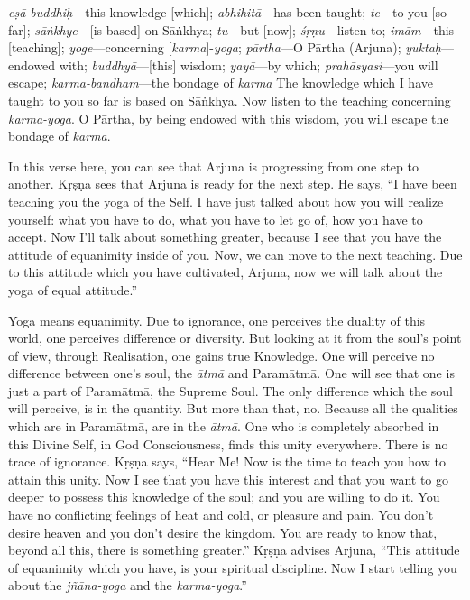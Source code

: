 {%
  \textit{eṣā buddhiḥ}---this knowledge [which]; 
  \textit{abhihitā}---has been taught; 
  \textit{te}---to you [so far]; 
  \textit{sāṅkhye}---[is based] on Sāṅkhya; 
  \textit{tu}---but [now]; 
  \textit{śṛṇu}---listen to; 
  \textit{imām}---this [teaching]; 
  \textit{yoge}---concerning [\textit{karma}]-\textit{yoga}; 
  \textit{pārtha}---O Pārtha (Arjuna); 
  \textit{yuktaḥ}---endowed with; 
  \textit{buddhyā}---[this] wisdom; 
  \textit{yayā}---by which; 
  \textit{prahāsyasi}---you will escape; 
  \textit{karma-bandham}---the bondage of \textit{karma}
}
{%
  The knowledge which I have taught to you so far is based on Sāṅkhya. Now listen to the teaching concerning \textit{karma-yoga}. O Pārtha, by being endowed with this wisdom, you will escape the bondage of \textit{karma}.
}

In this verse here, you can see that Arjuna is progressing from one step to another. Kṛṣṇa sees that Arjuna is ready for the next step. He says, “I have been teaching you the yoga of the Self. I have just talked about how you will realize yourself: what you have to do, what you have to let go of, how you have to accept. Now I’ll talk about something greater, because I see that you have the attitude of equanimity inside of you. Now, we can move to the next teaching. Due to this attitude which you have cultivated, Arjuna, now we will talk about the yoga of equal attitude.”

Yoga means equanimity. Due to ignorance, one perceives the duality of this world, one perceives difference or diversity. But looking at it from the soul’s point of view, through Realisation, one gains true Knowledge. One will perceive no difference between one’s soul, the \textit{ātmā} and Paramātmā. One will see that one is just a part of Paramātmā, the Supreme Soul. The only difference which the soul will perceive, is in the quantity. But more than that, no. Because all the qualities which are in Paramātmā, are in the \textit{ātmā}. One who is completely absorbed in this Divine Self, in God Consciousness, finds this unity everywhere. There is no trace of ignorance. Kṛṣṇa says, “Hear Me! Now is the time to teach you how to attain this unity. Now I see that you have this interest and that you want to go deeper to possess this knowledge of the soul; and you are willing to do it. You have no conflicting feelings of heat and cold, or pleasure and pain. You don’t desire heaven and you don’t desire the kingdom. You are ready to know that, beyond all this, there is something greater.” Kṛṣṇa advises Arjuna, “This attitude of equanimity which you have, is your spiritual discipline. Now I start telling you about the \textit{jñāna-yoga} and the \textit{karma-yoga}.”

